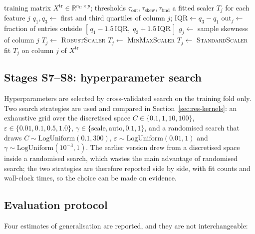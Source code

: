 \documentclass[pdflatex,sn-mathphys-num]{sn-jnl}
\begin{document}
\begin{algorithm}[htbp]
\caption{Distribution-aware scaler assignment (Stage S5), fitted on the training fold}
\label{alg:scaler}
\begin{algorithmic}[1]
\Require training matrix $X^{\text{tr}} \in \mathbb{R}^{n_{\text{tr}} \times p}$; thresholds $\tau_{\text{out}}, \tau_{\text{skew}}, \tau_{\text{bnd}}$
\Ensure a fitted scaler $T_j$ for each feature $j$
  \State $q_1, q_3 \gets$ first and third quartiles of column $j$; \; $\mathrm{IQR} \gets q_3 - q_1$
  \State $\mathrm{out}_j \gets$ fraction of entries outside $[\,q_1 - 1.5\,\mathrm{IQR},\; q_3 + 1.5\,\mathrm{IQR}\,]$
  \State $g_j \gets$ sample skewness of column $j$
    \State $T_j \gets$ \textsc{RobustScaler} 
    \State $T_j \gets$ \textsc{MinMaxScaler} 
  \Else
    \State $T_j \gets$ \textsc{StandardScaler}
  \EndIf
  \State fit $T_j$ on column $j$ of $X^{\text{tr}}$
\EndFor
\end{algorithmic}
\end{algorithm}

\subsection{Stages S7--S8: hyperparameter search}\label{sec:tuning}
Hyperparameters are selected by cross-validated search on the training fold only. Two search strategies are used and compared in Section~\ref{sec:res-kernels}: an exhaustive grid over the discretised space $C \in \{0.1, 1, 10, 100\}$, $\varepsilon \in \{0.01, 0.1, 0.5, 1.0\}$, $\gamma \in \{\text{scale}, \text{auto}, 0.1, 1\}$, and a randomised search \cite{bergstra2012} that draws $C \sim \mathrm{LogUniform}(0.1, 300)$, $\varepsilon \sim \mathrm{LogUniform}(0.01, 1)$ and $\gamma \sim \mathrm{LogUniform}(10^{-3}, 1)$. The earlier version drew from a discretised space inside a randomised search, which wastes the main advantage of randomised search; the two strategies are therefore reported side by side, with fit counts and wall-clock times, so the choice can be made on evidence.

\subsection{Evaluation protocol}\label{sec:eval-protocol}
Four estimates of generalisation are reported, and they are not interchangeable:
\end{document}

